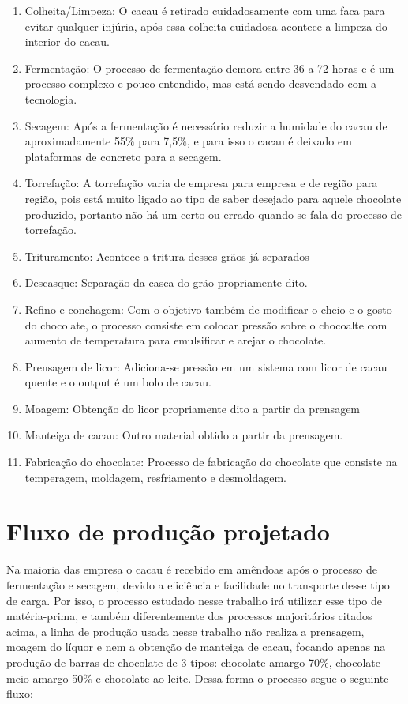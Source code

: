 \documentclass[
	12pt,				%
	openright,			%
	oneside,			%
	a4paper,			%
	english,			%
	french,				%
	spanish,			%
	brazil				%
	]{abntex2}
\begin{document}
\begin{enumerate}
\item Colheita/Limpeza: O cacau é retirado cuidadosamente com uma faca para evitar qualquer injúria, após essa colheita cuidadosa acontece a limpeza do interior do cacau.
\item Fermentação: O processo de fermentação demora entre 36 a 72 horas e é um processo complexo e pouco entendido, mas está sendo desvendado com a tecnologia.
\item Secagem: Após a fermentação é necessário reduzir a humidade do cacau de aproximadamente 55$\%$ para 7,5$\%$, e para isso o cacau é deixado em plataformas de concreto para a secagem.
\item Torrefação: A torrefação varia de empresa para empresa e de região para região, pois está muito ligado ao tipo de saber desejado para aquele chocolate produzido, portanto não há um certo ou errado quando se fala do processo de torrefação.
\item Trituramento: Acontece a tritura desses grãos já separados
\item Descasque: Separação da casca do grão propriamente dito.
\item Refino e conchagem: Com o objetivo também de modificar o cheio e o gosto do chocolate, o processo consiste em colocar pressão sobre o chocoalte com aumento de temperatura para emulsificar e arejar o chocolate.
\item Prensagem de licor: Adiciona-se pressão em um sistema com licor de cacau quente e o output é um bolo de cacau.
\item Moagem: Obtenção do licor propriamente dito a partir da prensagem
\item Manteiga de cacau: Outro material obtido a partir da prensagem.
\item Fabricação do chocolate: Processo de fabricação do chocolate que consiste na temperagem, moldagem, resfriamento e desmoldagem.
\end{enumerate}

\section{Fluxo de produção projetado}

Na maioria das empresa o cacau é recebido em amêndoas após o processo de fermentação e secagem, devido a eficiência e facilidade no transporte desse tipo de carga. Por isso, o processo estudado nesse trabalho irá utilizar esse tipo de matéria-prima, e também diferentemente dos processos majoritários citados acima, a linha de produção usada nesse trabalho não realiza a prensagem, moagem do líquor e nem a obtenção de manteiga de cacau, focando apenas na produção de barras de chocolate de 3 tipos: chocolate amargo 70$\%$, chocolate meio amargo 50$\%$ e chocolate ao leite. Dessa forma o processo segue o seguinte fluxo:
\end{document}
